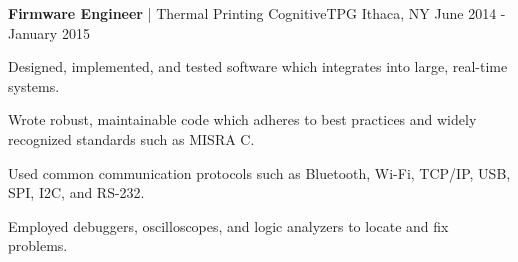 \begin{cventries}
{\begin{cvitemstwo}
      \end{cvitemstwo}
    }
  \cventry
    {\textbf{Firmware Engineer} | Thermal Printing}
    {CognitiveTPG}
    {Ithaca, NY}
    {June 2014 - January 2015}
    {
      \begin{cvitems}
        \item {Designed, implemented, and tested software which integrates into large, real-time systems.}
        \item {Wrote robust, maintainable code which adheres to best practices and widely recognized standards such as MISRA C.}
        \item {Used common communication protocols such as Bluetooth, Wi-Fi, TCP/IP, USB, SPI, I2C, and RS-232.}
        \item {Employed debuggers, oscilloscopes, and logic analyzers to locate and fix problems.}
      \end{cvitems}
    }
\end{cventries}